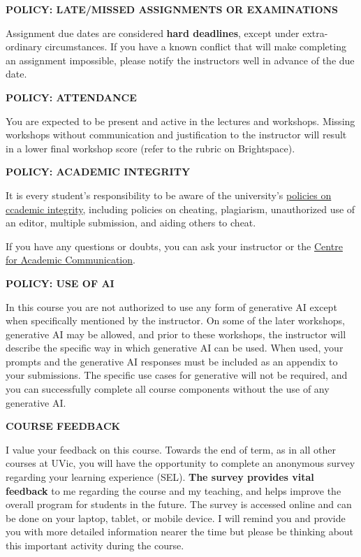 \documentclass[11pt]{article}
\begin{document}
\textbf{POLICY: LATE/MISSED ASSIGNMENTS OR EXAMINATIONS}

Assignment due dates are considered \textbf{hard deadlines}, except under extra-ordinary circumstances. If you have a known conflict that will make completing an assignment impossible, please notify the instructors well in advance of the due date.

\textbf{POLICY: ATTENDANCE}

You are expected to be present and active in the lectures and workshops. Missing workshops without communication and justification to the instructor will result in a lower final workshop score (refer to the rubric on Brightspace). 

\textbf{POLICY: ACADEMIC INTEGRITY}

It is every student's responsibility to be aware of the university's \href{https://web.uvic.ca/calendar/undergrad/info/regulations/academic-integrity.html}{policies on ccademic integrity}, including policies on cheating, plagiarism, unauthorized use of an editor, multiple submission, and aiding others to cheat. 

If you have any questions or doubts, you can ask your instructor or the \href{https://uvic.ca/learningandteaching/cac}{Centre for Academic Communication}.


\textbf{POLICY: USE OF AI}

In this course you are not authorized to use any form of generative AI except when specifically mentioned by the instructor. On some of the later workshops, generative AI may be allowed, and prior to these workshops, the instructor will describe the specific way in which generative AI can be used. When used, your prompts and the generative AI responses must be included as an appendix to your submissions. The specific use cases for generative will not be required, and you can successfully complete all course components without the use of any generative AI.

\begin{center}
  \textbf{COURSE FEEDBACK}
\end{center}
\smallskip
\vspace*{-.6em}
I value your feedback on this course. Towards the end of term, as in all other courses at UVic, you will have the opportunity to complete an anonymous survey regarding your learning experience (SEL). \textbf{The survey provides vital feedback} to me regarding the course and my teaching, and helps improve the overall program for students in the future. The survey is accessed online and can be done on your laptop, tablet, or mobile device. I will remind you and provide you with more detailed information nearer the time but please be thinking about this important activity during the course.
\end{document}
